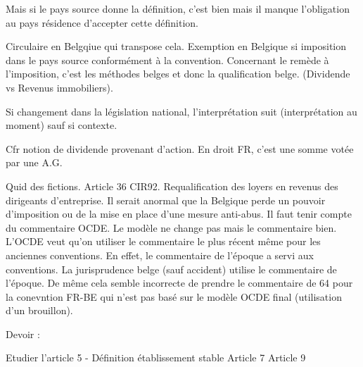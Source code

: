 \documentclass{book}
\begin{document}
Mais si le pays source donne la définition, c’est bien mais il manque l’obligation au pays résidence d’accepter cette définition.

Circulaire en Belgqiue qui transpose cela. Exemption en Belgique si imposition dans le pays source conformément à la convention. Concernant le remède à l’imposition, c’est les méthodes belges et donc la qualification belge. (Dividende vs Revenus immobiliers).

Si changement dans la législation national, l’interprétation suit (interprétation au moment) sauf si contexte.

Cfr notion de dividende provenant d'action. En droit FR, c'est une somme votée par une A.G.

Quid des fictions. Article 36 CIR92. Requalification des loyers en revenus des dirigeants d'entreprise. Il serait anormal que la Belgique perde un pouvoir d'imposition ou de la mise en place d'une mesure anti-abus. Il faut tenir compte du commentaire OCDE. Le modèle ne change pas mais le commentaire bien. L'OCDE veut qu'on utiliser le commentaire le plus récent même pour les anciennes conventions. En effet, le commentaire de l'époque a servi aux conventions. La jurisprudence belge (sauf accident) utilise le commentaire de l'époque. De même cela semble incorrecte de prendre le commentaire de 64 pour la conevntion FR-BE qui n'est pas basé sur le modèle OCDE final (utilisation d'un brouillon).

Devoir :

Etudier l'article 5 - Définition établissement stable
Article 7
Article 9
 





\nocite{*}

\end{document}
